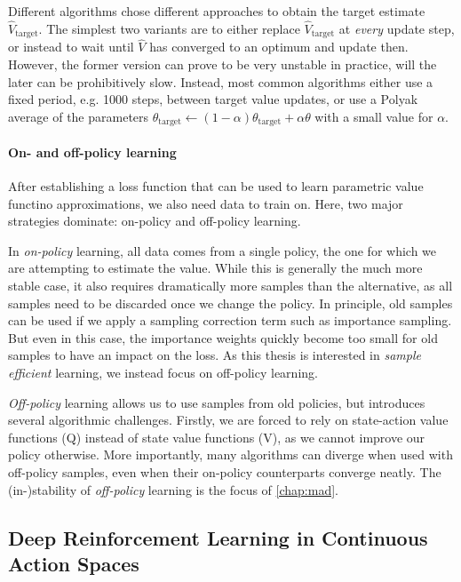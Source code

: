 Different algorithms chose different approaches to obtain the target estimate $\hat{V}_\mathrm{target}$.
The simplest two variants are to either replace $\hat{V}_\mathrm{target}$ at \emph{every} update step, or instead to wait until $\hat{V}$ has converged to an optimum and update then.
However, the former version can prove to be very unstable in practice, will the later can be prohibitively slow.
Instead, most common algorithms either use a fixed period, e.g. 1000 steps, between target value updates, or use a Polyak average of the parameters $\theta_\mathrm{target} \leftarrow (1 - \alpha) \theta_\mathrm{target} + \alpha \theta$ with a small value for $\alpha$.

\paragraph{On- and off-policy learning}

After establishing a loss function that can be used to learn parametric value functino approximations, we also need data to train on.
Here, two major strategies dominate: on-policy and off-policy learning.

In \emph{on-policy} learning, all data comes from a single policy, the one for which we are attempting to estimate the value.
While this is generally the much more stable case, it also requires dramatically more samples than the alternative, as all samples need to be discarded once we change the policy.
In principle, old samples can be used if we apply a sampling correction term such as importance sampling.
But even in this case, the importance weights quickly become too small for old samples to have an impact on the loss.
As this thesis is interested in \emph{sample efficient} learning, we instead focus on off-policy learning.

\emph{Off-policy} learning allows us to use samples from old policies, but introduces several algorithmic challenges.
Firstly, we are forced to rely on state-action value functions (Q) instead of state value functions (V), as we cannot improve our policy otherwise.
More importantly, many algorithms can diverge when used with off-policy samples, even when their on-policy counterparts converge neatly.
The (in-)stability of \emph{off-policy} learning is the focus of \autoref{chap:mad}.

\subsection{Deep Reinforcement Learning in Continuous Action Spaces}



